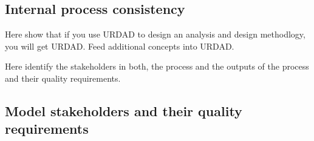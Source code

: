 \subsection{Internal process consistency}


Here show that if you use URDAD to design an analysis and design methodlogy, you will get URDAD. Feed additional concepts into URDAD.

Here identify the stakeholders in both, the process and the outputs of the process and their quality requirements.

\subsection{Model stakeholders and their quality requirements}